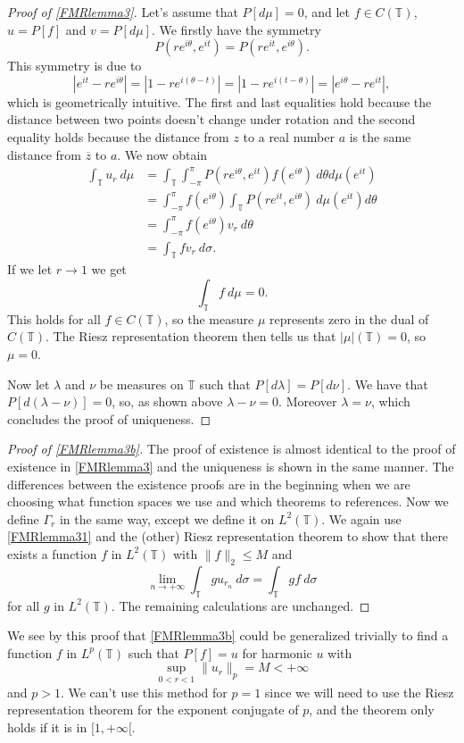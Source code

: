 \documentclass[a4paper,12pt,twoside,BCOR=10mm]{scrbook}
\theoremstyle{definition}
\theoremstyle{definition}
\theoremstyle{definition}
\begin{document}
\begin{proof}[Proof of \ref{FMRlemma3}]
Let's assume that $P[d\mu] = 0$, and let $f \in C(\mathbb{T})$, $u = P[f]$ and $v = P[d\mu]$.
We firstly have the symmetry
\[
	P(re^{i\theta}, e^{it})
	=
	P(re^{it}, e^{i\theta}).
\]
This symmetry is due to
\[
	|e^{it} - re^{i\theta}|
	=
	|1 - re^{i(\theta - t)}|
	=
	|1 - re^{i(t - \theta)}|
	=
	|e^{i\theta} - re^{it}|,
\]
which is geometrically intuitive.
The first and last equalities hold because the distance between two points doesn't change under rotation and the second equality holds because the distance from $z$ to a real number $a$ is the same distance from $\overline{z}$ to $a$.
We now obtain
\begin{align*}
\int_{\mathbb{T}} u_r\ d\mu
&= \int_{\mathbb{T}} \int_{-\pi}^{\pi} P(re^{i\theta}, e^{it}) f(e^{i\theta})\ d\theta d\mu(e^{it})\\
&= \int_{-\pi}^{\pi} f(e^{i\theta}) \int_{\mathbb{T}} P(re^{it}, e^{i\theta})\ d\mu(e^{it}) d\theta\\
&= \int_{-\pi}^{\pi} f(e^{i\theta}) v_r\ d\theta\\
&= \int_{\mathbb{T}} fv_r\ d\sigma.
\end{align*}
If we let $r \rightarrow 1$ we get
\[
	\int_{\mathbb{T}}f\ d\mu = 0.
\]
This holds for all $f \in C(\mathbb{T})$, so the measure $\mu$ represents zero in the dual of $C(\mathbb{T})$.
The Riesz representation theorem then tells us that $|\mu|(\mathbb{T}) = 0$, so $\mu = 0$.

Now let $\lambda$ and $\nu$ be measures on $\mathbb{T}$ such that $P[d\lambda] = P[d\nu]$.
We have that $P[d(\lambda - \nu)] = 0$, so, as shown above $\lambda - \nu = 0$.
Moreover $\lambda = \nu$, which concludes the proof of uniqueness.
\end{proof}
\begin{proof}[Proof of \ref{FMRlemma3b}]
The proof of existence is almost identical to the proof of existence in \ref{FMRlemma3} and the uniqueness is shown in the same manner.
The differences between the existence proofs are in the beginning when we are choosing what function spaces we use and which theorems to references.
Now we define $\Gamma_r$ in the same way, except we define it on $L^2(\mathbb{T})$.
We again use \ref{FMRlemma31} and the (other) Riesz representation theorem to show that there exists a function $f$ in $L^2(\mathbb{T})$ with $\|f\|_2 \leq M$ and
\[
	\lim_{n \rightarrow +\infty} \int_{\mathbb{T}} gu_{r_n}\ d\sigma = \int_{\mathbb{T}}gf\ d\sigma
\]
for all $g$ in $L^2(\mathbb{T})$.
The remaining calculations are unchanged.
\end{proof}
We see by this proof that \ref{FMRlemma3b} could be generalized trivially to find a function $f$ in $L^p(\mathbb{T})$ such that $P[f] = u$ for harmonic $u$ with
\[
	\sup_{0 < r < 1} \|u_r\|_p = M < +\infty
\]
and $p > 1$.
We can't use this method for $p = 1$ since we will need to use the Riesz representation theorem for the exponent conjugate of $p$, and the theorem only holds if it is in $[1, +\infty[$.
\end{document}
